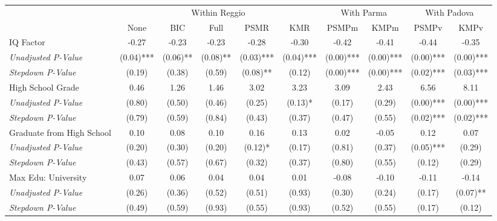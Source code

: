 \begin{tabular}{l c c c c c c c c c}
\toprule
& \multicolumn{5}{c}{Within Reggio} & \multicolumn{2}{c}{With Parma} & \multicolumn{2}{c}{With Padova} \\\cmidrule(lr){2-6} \cmidrule(lr){7-8} \cmidrule(lr){9-10}
 & None & BIC & Full & PSMR & KMR & PSMPm & KMPm & PSMPv & KMPv \\
\midrule
IQ Factor & -0.27 & -0.23 & -0.23 & -0.28 & -0.30 & -0.42 & -0.41 & -0.44 & -0.35 \\
\quad \textit{Unadjusted P-Value} & (0.04)*** & (0.06)** & (0.08)** & (0.03)*** & (0.04)*** & (0.00)*** & (0.00)*** & (0.00)*** & (0.00)*** \\
\quad \textit{Stepdown P-Value} & (0.19) & (0.38) & (0.59) & (0.08)** & (0.12) & (0.00)*** & (0.00)*** & (0.02)*** & (0.03)*** \\
High School Grade & 0.46 & 1.26 & 1.46 & 3.02 & 3.23 & 3.09 & 2.43 & 6.56 & 8.11 \\
\quad \textit{Unadjusted P-Value} & (0.80) & (0.50) & (0.46) & (0.25) & (0.13)* & (0.17) & (0.29) & (0.00)*** & (0.00)*** \\
\quad \textit{Stepdown P-Value} & (0.79) & (0.59) & (0.84) & (0.43) & (0.37) & (0.47) & (0.55) & (0.02)*** & (0.02)*** \\
Graduate from High School & 0.10 & 0.08 & 0.10 & 0.16 & 0.13 & 0.02 & -0.05 & 0.12 & 0.07 \\
\quad \textit{Unadjusted P-Value} & (0.20) & (0.30) & (0.20) & (0.12)* & (0.17) & (0.81) & (0.37) & (0.05)*** & (0.29) \\
\quad \textit{Stepdown P-Value} & (0.43) & (0.57) & (0.67) & (0.32) & (0.37) & (0.80) & (0.55) & (0.12) & (0.29) \\
Max Edu: University & 0.07 & 0.06 & 0.04 & 0.04 & 0.01 & -0.08 & -0.10 & -0.11 & -0.14 \\
\quad \textit{Unadjusted P-Value} & (0.26) & (0.36) & (0.52) & (0.51) & (0.93) & (0.30) & (0.24) & (0.17) & (0.07)** \\
\quad \textit{Stepdown P-Value} & (0.49) & (0.59) & (0.93) & (0.55) & (0.93) & (0.52) & (0.55) & (0.17) & (0.12) \\
\bottomrule
\end{tabular}
